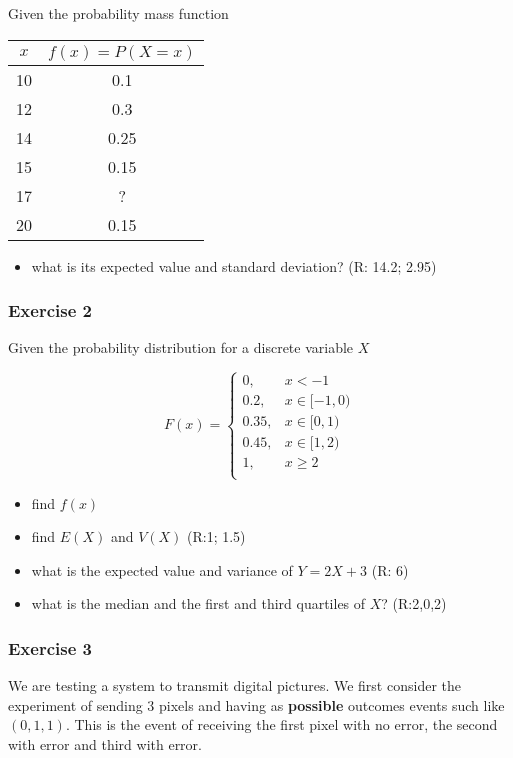\documentclass[
]{book}
\providecommand{\tightlist}{%
  \setlength{\itemsep}{0pt}\setlength{\parskip}{0pt}}
\begin{document}
Given the probability mass function

\begin{longtable}[]{@{}cc@{}}
\toprule
\(x\) & \(f(x)=P(X=x)\) \\
\midrule
\endhead
10 & 0.1 \\
12 & 0.3 \\
14 & 0.25 \\
15 & 0.15 \\
17 & ? \\
20 & 0.15 \\
\bottomrule
\end{longtable}

\begin{itemize}
\tightlist
\item
  what is its expected value and standard deviation? (R: 14.2; 2.95)
\end{itemize}

\hypertarget{exercise-2-3}{%
\subsubsection{Exercise 2}\label{exercise-2-3}}

Given the probability distribution for a discrete variable \(X\)

\[
    F(x)= 
\begin{cases}
0, & x < -1 \\
0.2,& x \in [-1,0)\\
0.35,& x \in [0,1)\\
0.45,& x \in [1,2)\\
1,& x \geq 2\\
\end{cases}
\]

\begin{itemize}
\tightlist
\item
  find \(f(x)\)
\item
  find \(E(X)\) and \(V(X)\) (R:1; 1.5)
\item
  what is the expected value and variance of \(Y=2X+3\) (R: 6)
\item
  what is the median and the first and third quartiles of \(X\)? (R:2,0,2)
\end{itemize}

\hypertarget{exercise-3-1}{%
\subsubsection{Exercise 3}\label{exercise-3-1}}

We are testing a system to transmit digital pictures. We first consider the experiment of sending \(3\) pixels and having as \textbf{possible} outcomes events such like \((0,1,1)\). This is the event of receiving the first pixel with no error, the second with error and third with error.
\end{document}
